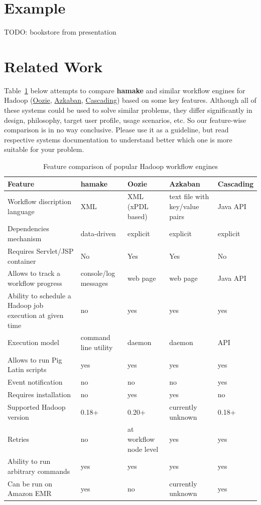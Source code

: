 \documentclass{article}
\begin{document}
\section{Example}

TODO: bookstore from presentation

\section{Related Work}

Table~\ref{table:1} below attempts to compare \textbf{hamake} and similar
workflow engines for Hadoop
(\href{http://github.com/tucu00/oozie1}{Oozie},
\href{http://sna-projects.com/azkaban/}{Azkaban},
\href{http://www.cascading.org/}{Cascading}) based on some key
features. Although all of these systems could be used to solve similar
problems, they differ significantly in design, philosophy, target user
profile, usage scenarios, etc.  So our feature-wise comparison is in
no way conclusive. Please use it as a guideline, but read respective
systems documentation to understand better which one is more suitable
for your problem.

\begin{table}
  \begin{tabular}{ | p{3cm} || l | l | l | l |}
    \hline
    \textbf{Feature} & \textbf{hamake} & \textbf{Oozie} & \textbf{Azkaban} & \textbf{Cascading} \\
    \hline
    Workflow discription language & XML & XML (xPDL based) & text file with key/value pairs & Java API \\
    Dependencies mechanism & data-driven & explicit & explicit & explicit \\
    Requires Servlet/JSP container & No & Yes & Yes & No \\
    Allows to track a workflow progress & console/log messages & web page & web page & Java API \\
    Ability to schedule a Hadoop job execution at given time & no & yes & yes & yes \\
    Execution model & command line utility & daemon & daemon & API \\
    Allows to run Pig Latin scripts & yes & yes & yes & yes \\
    Event notification & no & no & no & yes \\
    Requires installation & no & yes & yes & no \\
    Supported Hadoop version & 0.18+ & 0.20+ & currently unknown & 0.18+ \\
    Retries & no & at workflow node level & yes & yes \\
    Ability to run arbitrary commands & yes & yes & yes & yes \\
    Can be run on  Amazon EMR & yes & no & currently unknown & yes \\
    \hline
  \end{tabular}
  \caption{Feature comparison of popular Hadoop workflow engines }
  \label{table:1}
\end{table}
\end{document}
